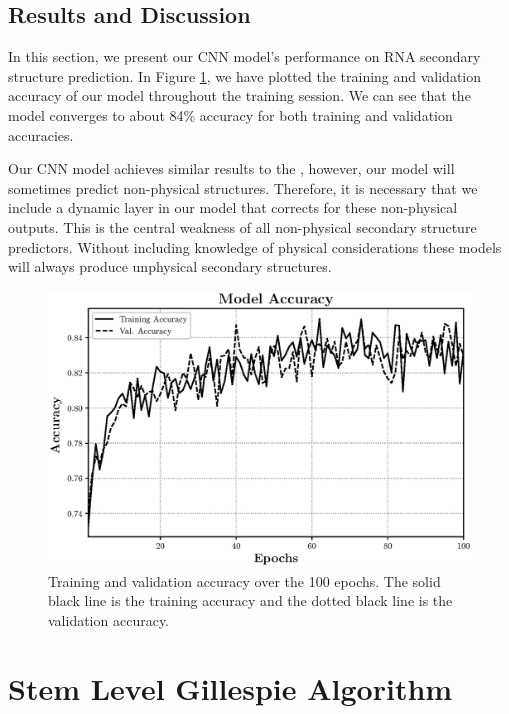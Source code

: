 \documentclass[11pt]{article}
\begin{document}
\begin{multicols}{2}
\subsection{Results and Discussion}
In this section, we present our CNN model's performance on RNA secondary structure prediction. In Figure \ref{fig:acc}, we have plotted the training and validation accuracy of our model throughout the training session. We can see that the model converges to about 84\% accuracy for both training and validation accuracies.

Our CNN model achieves similar results to the \cite{10.3389/fgene.2019.00467}, however, our model will sometimes predict non-physical structures. Therefore, it is necessary that we include a dynamic layer in our model that corrects for these non-physical outputs. This is the central weakness of all non-physical secondary structure predictors. Without including knowledge of physical considerations these models will always produce unphysical secondary structures.

\end{multicols}
\begin{figure}[H]
\centering
\includegraphics[width = \textwidth]{fig/acc}
\caption{Training and validation accuracy over the 100 epochs. The solid black line is the training accuracy and the dotted black line is the validation accuracy.}
\label{fig:acc}
\end{figure}



\section{Stem Level Gillespie Algorithm}
\end{document}

